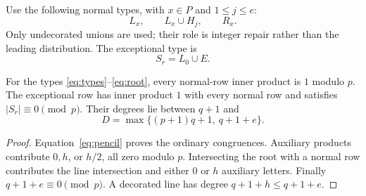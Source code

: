 Use the following normal types, with $x\in P$ and $1\le j\le e$:
\begin{equation}\label{eq:types}
 L_x,\qquad L_x\cup H_j,\qquad R_x.
\end{equation}
Only undecorated unions are used; their role is integer repair rather than the leading distribution. The exceptional type is
\begin{equation}\label{eq:root}
 S_r=L_0\cup E.
\end{equation}
\begin{lemma}\label{lem:gram}
For the types \eqref{eq:types}--\eqref{eq:root}, every normal-row inner product is $1$ modulo $p$. The exceptional row has inner product $1$ with every normal row and satisfies $|S_r|\equiv0\pmod p$. Their degrees lie between $q+1$ and
\begin{equation}\label{eq:degree}
 D=\max\{(p+1)q+1,\ q+1+e\}.
\end{equation}
\end{lemma}
\begin{proof}
Equation~\eqref{eq:pencil} proves the ordinary congruences. Auxiliary products contribute $0,h$, or $h/2$, all zero modulo $p$. Intersecting the root with a normal row contributes the line intersection and either $0$ or $h$ auxiliary letters. Finally $q+1+e\equiv0\pmod p$. A decorated line has degree $q+1+h\le q+1+e$.
\end{proof}
